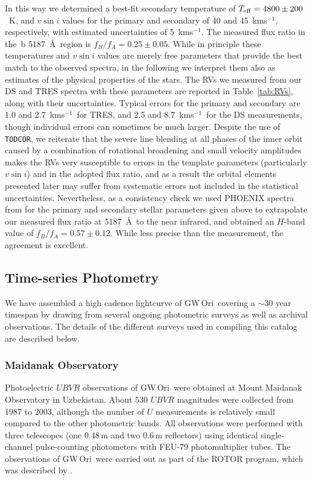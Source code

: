 \documentclass[twocolumn]{aastex61}
\newcommand\kms{\ifmmode{\rm km\thinspace s^{-1}}\else km\thinspace s$^{-1}$\fi}
\newcommand{\obj}{GW\,Ori}
\begin{document}
In this way we determined a best-fit secondary temperature of $T_{\rm eff} = 4800 \pm 200$~K, and $v \sin i$ values for the primary and secondary of 40 and 45~\kms, respectively, with estimated uncertainties of 5~\kms. The measured flux ratio in the \,b 5187~\AA\ region is $f_B/f_A = 0.25 \pm 0.05$. While in principle these temperatures and $v \sin i$ values are merely free parameters that provide the best match to the observed spectra, in the following we interpret them also as estimates of the physical properties of the stars. The RVs we measured from our DS and TRES spectra with these parameters are reported in Table~\ref{tab:RVs}, along with their uncertainties.
Typical errors for the primary and secondary are 1.0 and 2.7~\kms\ for TRES, and 2.5 and 8.7~\kms\ for the DS measurements, though individual errors can sometimes be much larger. Despite the use of {\tt TODCOR}, we reiterate that the severe line blending at all phases of the inner orbit caused by a combination of rotational broadening and small velocity amplitudes makes the RVs very susceptible to errors in the template parameters (particularly $v \sin i$) and in the adopted flux ratio, and as a result the orbital elements presented later may suffer from systematic errors not included in the statistical uncertainties. Nevertheless, as a consistency check we used PHOENIX spectra from \cite{husser13} for the primary and secondary stellar parameters given above to extrapolate our measured flux ratio at 5187~\AA\ to the near infrared, and obtained an $H$-band value of $f_B/f_A = 0.57 \pm 0.12$. While less precise than the \cite{berger11} measurement, the agreement is excellent.



\subsection{Time-series Photometry}

We have assembled a high cadence lightcurve of \obj\ covering a $\sim$30 year timespan by drawing from several ongoing photometric surveys as well as archival observations. The details of the different surveys used in compiling this catalog are described below.


\subsubsection{Maidanak Observatory}

Photoelectric $UBVR$ observations of \obj\ were obtained at Mount Maidanak Observatory in Uzbekistan. About 530 $UBVR$ magnitudes were collected from 1987 to 2003, although the number of $U$ measurements is relatively small compared to the other photometric bands.
All observations were performed with three telescopes (one 0.48\,m and two 0.6\,m reflectors) using identical single-channel pulse-counting photometers with FEU-79 photomultiplier tubes. The observations of \obj\ were carried out as part of the ROTOR program, which was described by \citet{shevchenko93}.
\end{document}

